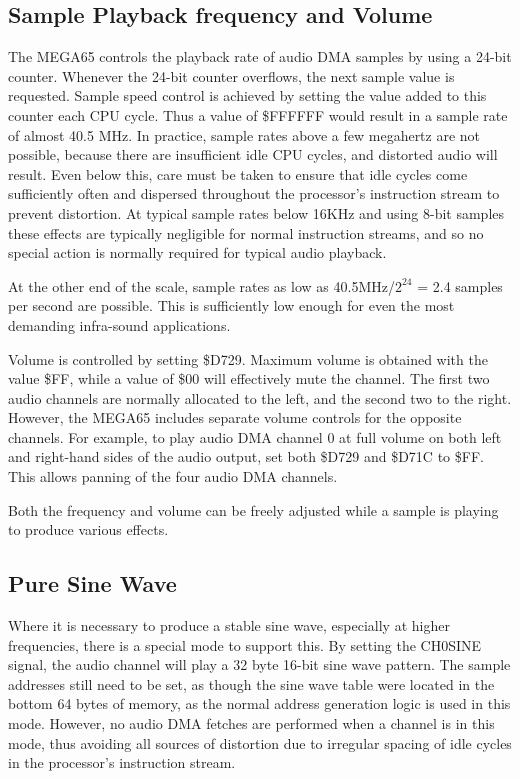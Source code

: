 \subsection{Sample Playback frequency and Volume}

The MEGA65 controls the playback rate of audio DMA samples by using a
24-bit counter.  Whenever the 24-bit counter overflows, the next
sample value is requested. Sample speed control is achieved by setting the
value added to this counter each CPU cycle.  Thus a value of
\$FFFFFF would result in a sample rate of almost 40.5 MHz.  In
practice, sample rates above a few megahertz are not possible, because
there are insufficient idle CPU cycles, and distorted audio will
result.  Even below this, care must be taken to ensure that idle
cycles come sufficiently often and dispersed throughout the
processor's instruction stream to prevent distortion.  At typical
sample rates below 16KHz and using 8-bit samples these effects are
typically negligible for normal instruction streams, and so no special
action is normally required for typical audio playback.

At the other end of the scale, sample rates as low as 40.5MHz/$2^{24}$
= 2.4 samples per second are possible.  This is sufficiently low
enough for even the most demanding infra-sound applications.

Volume is controlled by setting \$D729.  Maximum volume is obtained
with the value \$FF, while a value of \$00 will effectively mute the
channel.  The first two audio channels are normally allocated to the
left, and the second two to the right.  However, the MEGA65 includes
separate volume controls for the opposite channels. For example, to
play audio DMA channel 0 at full volume on both left and right-hand sides
of the audio output, set both \$D729 and \$D71C to \$FF.  This allows
panning of the four audio DMA channels.

Both the frequency and volume can be freely adjusted while a sample is playing
to produce various effects.

\subsection{Pure Sine Wave}

Where it is necessary to produce a stable sine wave, especially at
higher frequencies,
there is a special mode to support this. By setting the CH0SINE
signal, the audio channel will play a 32 byte 16-bit sine wave
pattern.  The sample addresses still need to be set, as though the
sine wave table were located in the bottom 64 bytes of memory, as the
normal address generation logic is used in this mode. However, no
audio DMA fetches are performed when a channel is in this mode, thus
avoiding all sources of distortion due to irregular spacing of idle
cycles in the processor's instruction stream.

